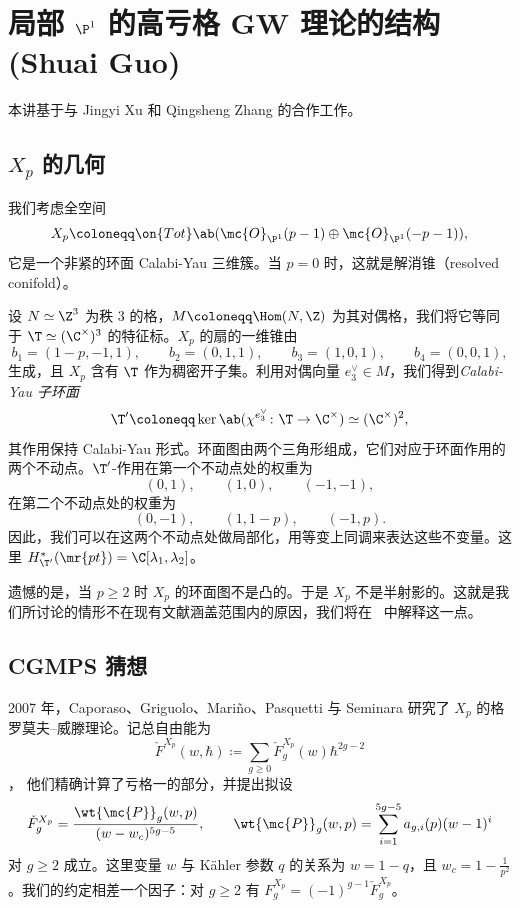 \section{\texorpdfstring{局部 \(\P^1\) 的高亏格 GW 理论的结构 (Shuai Guo)}{局部 P1 的高亏格 GW 理论的结构 (Shuai Guo)}}%
\label{sec:Structure of higher-genus GW theory of local P1 (Shuai Guo)}

本讲基于与 Jingyi Xu 和 Qingsheng Zhang 的合作工作。

\subsection{\(X_p\) 的几何}%
\label{sub:The geometry of Xp}

我们考虑全空间
\[ X_p \coloneqq \on{Tot}\ab(\mc{O}_{\P^1}(p-1) \oplus \mc{O}_{\P^1}(-p-1)), \]
它是一个非紧的环面 Calabi-Yau 三维簇。当 \(p = 0\) 时，这就是解消锥（resolved conifold）。

设 \(N \simeq \Z^3\) 为秩 \(3\) 的格，\(M \coloneqq \Hom(N,\Z)\) 为其对偶格，我们将它等同于 \(\T \simeq (\C^{\times})^3\) 的特征标。\(X_p\) 的扇的一维锥由
\[ b_1 = (1-p,-1,1), \qquad b_2 = (0,1,1), \qquad b_3 = (1,0,1), \qquad b_4 = (0,0,1), \]
生成，且 \(X_p\) 含有 \(\T\) 作为稠密开子集。利用对偶向量 \(e_3^{\vee} \in M\)，我们得到\textit{Calabi-Yau 子环面}
\[ \T' \coloneqq \ker\ab(\chi^{e_3^{\vee}} \colon \T \to \C^{\times}) \simeq (\C^{\times})^2, \]
其作用保持 Calabi-Yau 形式。环面图由两个三角形组成，它们对应于环面作用的两个不动点。\(\T'\)-作用在第一个不动点处的权重为
\[ (0,1), \qquad (1,0), \qquad (-1,-1), \]
在第二个不动点处的权重为
\[ (0,-1), \qquad (1,1-p), \qquad (-1,p). \]
因此，我们可以在这两个不动点处做局部化，用等变上同调来表达这些不变量。这里 \(H^*_{\T'}(\mr{pt}) = \C[\lambda_1,\lambda_2]\)。

遗憾的是，当 \(p \geq 2\) 时 \(X_p\) 的环面图不是凸的。于是 \(X_p\) 不是半射影的。这就是我们所讨论的情形不在现有文献涵盖范围内的原因，我们将在~ 中解释这一点。

\subsection{CGMPS 猜想}%
\label{sub:The conjecture of CGMPS}

2007 年，Caporaso、Griguolo、Mari\~{n}o、Pasquetti 与 Seminara 研究了 \(X_p\) 的格罗莫夫–威滕理论。记总自由能为
\[ \check{F}^{X_p}(w,\hbar) \coloneqq \sum_{g \geq 0} \check{F}_g^{X_p}(w) \hbar^{2g-2} \]，
他们精确计算了亏格一的部分，并提出拟设
\begin{equation}\label{eqn:cgmps ansatz}
    \check{F}_g^{X_p} = \frac{\wt{\mc{P}}_g(w,p)}{(w-w_c)^{5g-5}}, \qquad \wt{\mc{P}}_g(w,p) = \sum_{i=1}^{5g-5} a_{g,i}(p)(w-1)^i
\end{equation}
对 \(g \geq 2\) 成立。这里变量 \(w\) 与 Kähler 参数 \(q\) 的关系为 \(w = 1-q\)，且 \(w_c = 1 - \frac{1}{p^2}\)。我们的约定相差一个因子：对 \(g \geq 2\) 有 \(F_g^{X_p} = (-1)^{g-1}\check{F}_g^{X_p}\)。

